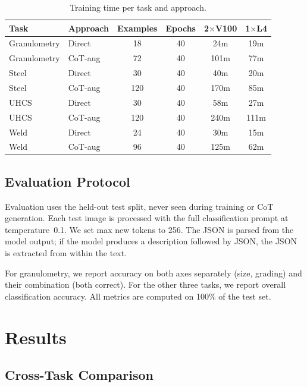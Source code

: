 \documentclass{bmvc2k}
\begin{document}
\begin{table}[t]
\centering
\scriptsize
\begin{tabular}{llcccc}
\toprule
Task & Approach & Examples & Epochs & 2$\times$V100 & 1$\times$L4 \\
\midrule
Granulometry & Direct & 18 & 40 & 24m & 19m \\
Granulometry & CoT-aug & 72 & 40 & 101m & 77m \\
Steel & Direct & 30 & 40 & 40m & 20m \\
Steel & CoT-aug & 120 & 40 & 170m & 85m \\
UHCS & Direct & 30 & 40 & 58m & 27m \\
UHCS & CoT-aug & 120 & 40 & 240m & 111m \\
Weld & Direct & 24 & 40 & 30m & 15m \\
Weld & CoT-aug & 96 & 40 & 125m & 62m \\
\bottomrule
\end{tabular}
\caption{Training time per task and approach.}
\label{tab:training_time}
\end{table}

\subsection{Evaluation Protocol}

Evaluation uses the held-out test split, never seen during training or CoT generation. Each test image is processed with the full classification prompt at temperature~0.1. We set max new tokens to 256. The JSON is parsed from the model output; if the model produces a description followed by JSON, the JSON is extracted from within the text.

For granulometry, we report accuracy on both axes separately (size, grading) and their combination (both correct). For the other three tasks, we report overall classification accuracy. All metrics are computed on 100\% of the test set.


\section{Results}
\label{sec:results}

\subsection{Cross-Task Comparison}
\end{document}
